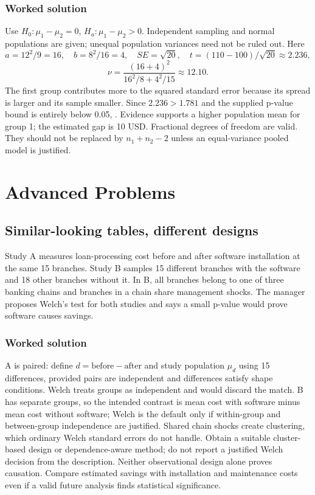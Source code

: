 \subsubsection*{Worked solution}\label{sol:unequal}
Use $H_0:\mu_1-\mu_2=0$, $H_a:\mu_1-\mu_2>0$. Independent sampling and normal populations are given; unequal population variances need not be ruled out. Here
\[
a=12^2/9=16,\quad b=8^2/16=4,\quad SE=\sqrt{20},
\quad t=(110-100)/\sqrt{20}\approx2.236,
\]
\[
\nu=\frac{(16+4)^2}{16^2/8+4^2/15}\approx12.10.
\]
The first group contributes more to the squared standard error because its spread is larger and its sample smaller. Since $2.236>1.781$ and the supplied p-value bound is entirely below 0.05, . Evidence supports a higher population mean for group 1; the estimated gap is 10 USD. Fractional degrees of freedom are valid. They should not be replaced by $n_1+n_2-2$ unless an equal-variance pooled model is justified.
\section{Advanced Problems}\label{sec:advanced}
\subsection{Similar-looking tables, different designs}\label{prob:design}
Study A measures loan-processing cost before and after software installation at the same 15 branches. Study B samples 15 different branches with the software and 18 other branches without it. In B, all branches belong to one of three banking chains and branches in a chain share management shocks. The manager proposes Welch's test for both studies and says a small p-value would prove software causes savings.
\subsubsection*{Worked solution}\label{sol:design}
A is paired: define $d=\text{before}-\text{after}$ and study population $\mu_d$ using 15 differences, provided pairs are independent and differences satisfy shape conditions. Welch treats groups as independent and would discard the match. B has separate groups, so the intended contrast is mean cost with software minus mean cost without software; Welch is the default only if within-group and between-group independence are justified. Shared chain shocks create clustering, which ordinary Welch standard errors do not handle. Obtain a suitable cluster-based design or dependence-aware method; do not report a justified Welch decision from the description. Neither observational design alone proves causation. Compare estimated savings with installation and maintenance costs even if a valid future analysis finds statistical significance.


